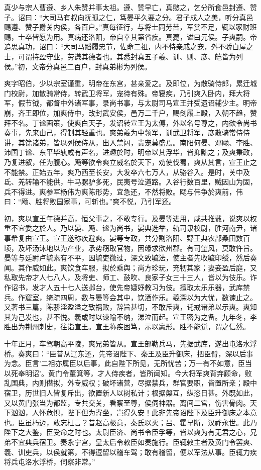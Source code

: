 \documentclass[12pt,UTF8]{ctexbook}
\begin{document}
真少与宗人曹遵、乡人朱赞并事太祖。遵、赞早亡，真愍之，乞分所食邑封遵、赞子。诏曰：“大司马有叔向抚孤之仁，笃晏平久要之分。君子成人之美，听分真邑赐遵、赞子爵关内侯，各百户。”真每征行，与将士同劳苦，军赏不足，辄以家财班赐，士卒皆愿为用。真病还洛阳，帝自幸其第省疾。真薨，谥曰元侯。子爽嗣。帝追思真功，诏曰：“大司马蹈履忠节，佐命二祖，内不恃亲戚之宠，外不骄白屋之士，可谓持盈守业，劳谦其德者也。其悉封真五子羲、训、则、彦、皑皆为列侯。”初，文帝分真邑二百户，封真弟彬为列侯。

爽字昭伯，少以宗室谨重，明帝在东宫，甚亲爱之。及即位，为散骑侍郎，累迁城门校尉，加散骑常侍，转武卫将军，宠待有殊。帝寝疾，乃引爽入卧内，拜大将军，假节钺，都督中外诸军事，录尚书事，与太尉司马宣王并受遗诏辅少主。明帝崩，齐王即位，加爽侍中，改封武安侯，邑万二千户，赐剑履上殿，入朝不趋，赞拜不名。丁谧画策，使爽白天子，发诏转宣王为太傅，外以名号尊之，内欲令尚书奏事，先来由己，得制其轻重也。爽弟羲为中领军，训武卫将军，彦散骑常侍侍讲，其馀诸弟，皆以列侯侍从，出入禁闼，贵宠莫盛焉。南阳何晏、邓飏、李胜、沛国丁谧、东平毕轨咸有声名，进趣於时，明帝以其浮华，皆抑黜之；及爽秉政，乃复进叙，任为腹心。飏等欲令爽立威名於天下，劝使伐蜀，爽从其言，宣王止之不能禁。正始五年，爽乃西至长安，大发卒六七万人，从骆谷入。是时，关中及氐、羌转输不能供，牛马骡驴多死，民夷号泣道路。入谷行数百里，贼因山为固，兵不得进。爽参军杨伟为爽陈形势，宜急还，不然将败。飏与伟争於爽前，伟曰：“飏、胜将败国家事，可斩也。”爽不悦，乃引军还。

初，爽以宣王年德并高，恒父事之，不敢专行。及晏等进用，咸共推戴，说爽以权重不宜委之於人。乃以晏、飏、谧为尚书，晏典选举，轨司隶校尉，胜河南尹，诸事希复由宣王。宣王遂称疾避爽。晏等专政，共分割洛阳、野王典农部桑田数百顷，及坏汤沐地以为产业，承势窃取官物，因缘求欲州郡。有司望风，莫敢忤旨。晏等与廷尉卢毓素有不平，因毓吏微过，深文致毓法，使主者先收毓印绶，然后奏闻。其作威如此。爽饮食车服，拟於乘舆；尚方珍玩，充牣其家；妻妾盈后庭，又私取先帝才人七八人，及将吏、师工、鼓吹、良家子女三十三人，皆以为伎乐。诈作诏书，发才人五十七人送邺台，使先帝婕妤教习为伎。擅取太乐乐器，武库禁兵。作窟室，绮疏四周，数与晏等会其中，饮酒作乐。羲深以为大忧，数谏止之。又著书三篇，陈骄淫盈溢之致祸败，辞旨甚切，不敢斥爽，讬戒诸弟以示爽。爽知其为己发也，甚不悦。羲或时以谏喻不纳，涕泣而起。宣王密为之备。九年冬，李胜出为荆州刺史，往诣宣王。宣王称疾困笃，示以羸形。胜不能觉，谓之信然。

十年正月，车驾朝高平陵，爽兄弟皆从。宣王部勒兵马，先据武库，遂出屯洛水浮桥。奏爽曰：“臣昔从辽东还，先帝诏陛下、秦王及臣升御床，把臣臂，深以后事为念。臣言'二祖亦属臣以后事，此自陛下所见，无所忧苦；万一有不如意，臣当以死奉明诏'。黄门令董箕等，才人侍疾者，皆所闻知。今大将军爽背弃顾命，败乱国典，内则僣拟，外专威权；破坏诸营，尽据禁兵，群官要职，皆置所亲；殿中宿卫，历世旧人皆复斥出，欲置新人以树私计；根据槃互，纵恣日甚。外既如此，又以黄门张当为都监，专共交关，看察至尊，侯伺神器。离间二宫，伤害骨肉。天下汹汹，人怀危惧，陛下但为寄坐，岂得久安！此非先帝诏陛下及臣升御床之本意也。臣虽朽迈，敢忘枉言？昔赵高极意，秦氏以灭；吕、霍早断，汉祚永世。此乃陛下之大鉴，臣受命之时也。太尉臣济、尚书令臣孚等，皆以爽为有无君之心，兄弟不宜典兵宿卫。奏永宁宫，皇太后令敕臣如奏施行。臣辄敕主者及黄门令罢爽、羲、训吏兵，以侯就第，不得逗留以稽车驾；敢有稽留，便以军法从事。臣辄力疾将兵屯洛水浮桥，伺察非常。”
\end{document}
